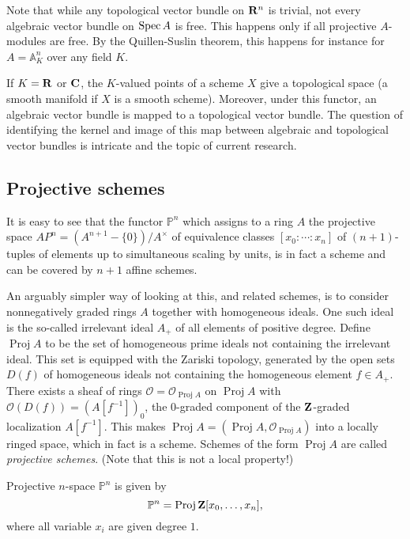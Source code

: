 \documentclass[a4paper,openany]{scrbook}
\DeclareMathOperator{\Proj}{Proj}
\newcommand{\Reg}[1]{\mathcal O_{#1}}
\begin{document}
\begin{remark}
Note that while any topological vector bundle on $\mathbf R^n$ is trivial, not every algebraic vector bundle on $\operatorname{Spec} A$ is free. This happens only if all projective $A$-modules are free. By the Quillen-Suslin theorem, this happens for instance for $A=\mathbb A^n_K$ over any field $K$.
\end{remark}


\begin{remark}
If $K=\mathbf R$ or $\mathbf C$, the $K$-valued points of a scheme $X$ give a topological space (a smooth manifold if $X$ is a smooth scheme). Moreover, under this functor, an algebraic vector bundle is mapped to a topological vector bundle. The question of identifying the kernel and image of this map between algebraic and topological vector bundles is intricate and the topic of current research.
\end{remark}

\subsection{Projective schemes} \label{subsec:projectiveschemes}

It is easy to see that the functor $\mathbb P^n$ which assigns to a ring $A$ the projective space $AP^n = (A^{n+1}-\{0\})/A^\times$ of equivalence classes $[x_0:\cdots:x_n]$ of $(n+1)$-tuples of elements up to simultaneous scaling by units, is in fact a scheme and can be covered by $n+1$ affine schemes.

An arguably simpler way of looking at this, and related schemes, is to consider nonnegatively graded rings $A$ together with homogeneous ideals. One such ideal is the so-called irrelevant ideal $A_+$ of all elements of positive degree. Define $\Proj A$ to be the set of homogeneous prime ideals not containing the irrelevant ideal. This set is equipped with the Zariski topology, generated by the open sets $D(f)$ of homogeneous ideals not containing the homogeneous element $f \in A_+$. There exists a sheaf of rings $\mathcal O=\Reg{\Proj A}$ on $\Proj A$ with $\mathcal O(D(f)) = (A[f^{-1}])_0$, the $0$-graded component of the $\mathbf Z$-graded localization $A[f^{-1}]$. This makes $\Proj A = (\Proj A,\Reg{\Proj A})$ into a locally ringed space, which in fact is a scheme. Schemes of the form $\Proj A$ are called \emph{projective schemes}. (Note that this is not a local property!)

\begin{example}
Projective $n$-space $\mathbb P^n$ is given by
\[
\mathbb P^n = \Proj \Z[x_0,\dots,x_n],
\]
where all variable $x_i$ are given degree $1$.
\end{example}
\end{document}
